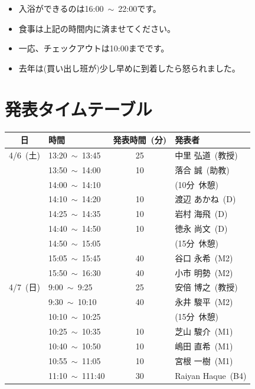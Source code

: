 \documentclass[unicode,a4paper,11pt]{ltjsarticle}
\begin{document}
\begin{itemize}
      \item
            入浴ができるのは16:00\ $\sim$\ 22:00です。
      \item
            食事は上記の時間内に済ませてください。
      \item
            一応、チェックアウトは10:00までです。
      \item
            去年は(買い出し班が)少し早めに到着したら怒られました。
\end{itemize}

\section{発表タイムテーブル}

\begin{center}
      \begin{tabular}{clcl}\hline
            日        & 時間                  & 発表時間\ (分) & 発表者             \\ \hline
            4/6\ (土) & 13:20\ $\sim$\ 13:45  & 25             & 中里 弘道\ (教授)  \\
                      & 13:50\ $\sim$\ 14:00  & 10             & 落合 誠\ (助教)    \\
                      & 14:00\ $\sim$\ 14:10  &                & (10分\ 休憩)       \\
                      & 14:10\ $\sim$\ 14:20  & 10             & 渡辺 あかね\ (D)   \\
                      & 14:25\ $\sim$\ 14:35  & 10             & 岩村 海飛\ (D)     \\
                      & 14:40\ $\sim$\ 14:50  & 10             & 徳永 尚文\ (D)     \\
                      & 14:50\ $\sim$\ 15:05  &                & (15分\ 休憩)       \\
                      & 15:05\ $\sim$\ 15:45  & 40             & 谷口 永希\ (M2)    \\
                      & 15:50\ $\sim$\ 16:30  & 40             & 小市 明勢\ (M2)    \\ \hline
            4/7\ (日) & 9:00\ $\sim$\ 9:25    & 25             & 安倍 博之\ (教授)  \\
                      & 9:30\ $\sim$\ 10:10   & 40             & 永井 駿平\ (M2)    \\
                      & 10:10\ $\sim$\ 10:25  &                & (15分\ 休憩)       \\
                      & 10:25\ $\sim$\ 10:35  & 10             & 芝山 駿介\ (M1)    \\
                      & 10:40\ $\sim$\ 10:50  & 10             & 嶋田 直希\ (M1)    \\
                      & 10:55\ $\sim$\ 11:05  & 10             & 宮根 一樹\ (M1)    \\
                      & 11:10\ $\sim$\ 111:40 & 30             & Raiyan Haque\ (B4) \\ \hline
      \end{tabular}
\end{center}
\end{document}
